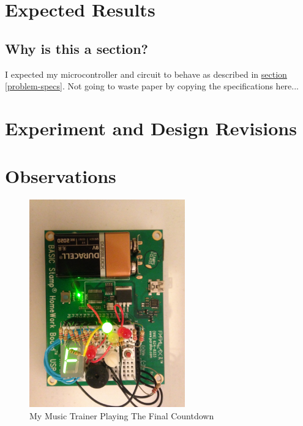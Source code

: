 \documentclass[11pt]{article}
\begin{document}
\section{Expected Results}

\subsection{Why is this a section?}
I expected my microcontroller and circuit to behave as described in
\hyperref[problem-specs]{section \ref{problem-specs}}.
Not going to waste paper by copying the specifications here...

\section{Experiment and Design Revisions}

\section{Observations}

\begin{figure}[h!]
\centering
\includegraphics[width=0.6\textwidth]{the-music-trainer.jpg}
\caption{My Music Trainer Playing The Final Countdown}
\label{the-music-trainer}
\end{figure}
\end{document}
